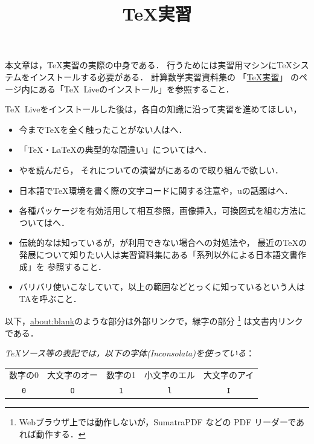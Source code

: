 \documentclass{ltjsarticle}
\title{\TeX 実習}
\begin{document}
\zw
\maketitle

本文章は，\TeX 実習の実際の中身である．
行うためには実習用マシンに\TeX システムをインストールする必要がある．
計算数学実習資料集の
「\href{https://github.com/utmsks/KSImaterial/blob/master/contents/tex/tex_practice.md}{\TeX 実習}」
のページ内にある「\TeX~Liveのインストール」を参照すること．


\TeX~Liveをインストールした後は，各自の知識に沿って実習を進めてほしい，
\begin{itemize}
\item 今まで\TeX を全く触ったことがない人はへ．
\item 「\TeX・\LaTeX の典型的な間違い」についてはへ．
\item {}やを読んだら，
 それについての演習がにあるので取り組んで欲しい．
\item 日本語で\TeX 環境を書く際の文字コードに関する注意や，u\pTeX の話題はへ．
\item 各種パッケージを有効活用して相互参照，画像挿入，可換図式を組む方法についてはへ．
\item 伝統的な\pLaTeX は知っているが，\pLaTeX が利用できない場合への対処法や，
最近の\TeX の発展について知りたい人は実習資料集にある「\pTeX 系列以外による日本語文書作成」を
参照すること．
\item バリバリ使いこなしていて，以上の範囲などとっくに知っているという人はTAを呼ぶこと．
\end{itemize}

以下，\url{about:blank}のような部分は外部リンクで，緑字の部分
\footnote{Webブラウザ上では動作しないが，SumatraPDF などの PDF リーダーであれば動作する．}
は文書内リンクである．

\bigskip

\emph{\TeX ソース等の表記では，以下の字体(Inconsolata)を使っている}：
\begin{center}
\begin{tabular}{ccccc}
\toprule
数字の0&大文字のオー&数字の1&小文字のエル&大文字のアイ\\
\cmidrule(lr){1-2}\cmidrule(lr){3-5}
\Large\texttt{0}&\Large\texttt{O}
&\Large\texttt{1}&\Large\texttt{l}&\Large\texttt{I}\\
\bottomrule
\end{tabular}
\end{center}
\end{document}
